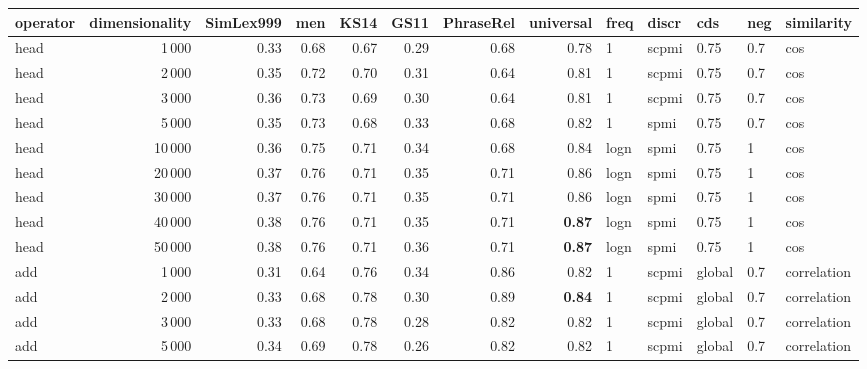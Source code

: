 \begin{tabular}{lrrrrrrrlllll}
\toprule
operator &  dimensionality &  SimLex999 &   men &  KS14 &  GS11 &  PhraseRel &  universal &  freq &  discr &     cds &  neg &     similarity \\
\midrule
    head &            1\,000 &       0.33 &  0.68 &  0.67 &  0.29 &       0.68 &       0.78 &     1 &  scpmi &    0.75 &  0.7 &            cos \\
    head &            2\,000 &       0.35 &  0.72 &  0.70 &  0.31 &       0.64 &       0.81 &     1 &  scpmi &    0.75 &  0.7 &            cos \\
    head &            3\,000 &       0.36 &  0.73 &  0.69 &  0.30 &       0.64 &       0.81 &     1 &  scpmi &    0.75 &  0.7 &            cos \\
    head &            5\,000 &       0.35 &  0.73 &  0.68 &  0.33 &       0.68 &       0.82 &     1 &   spmi &    0.75 &  0.7 &            cos \\
    head &           10\,000 &       0.36 &  0.75 &  0.71 &  0.34 &       0.68 &       0.84 &  logn &   spmi &    0.75 &    1 &            cos \\
    head &           20\,000 &       0.37 &  0.76 &  0.71 &  0.35 &       0.71 &       0.86 &  logn &   spmi &    0.75 &    1 &            cos \\
    head &           30\,000 &       0.37 &  0.76 &  0.71 &  0.35 &       0.71 &       0.86 &  logn &   spmi &    0.75 &    1 &            cos \\
    head &           40\,000 &       0.38 &  0.76 &  0.71 &  0.35 &       0.71 &       \textbf{0.87} &  logn &   spmi &    0.75 &    1 &            cos \\
    head &           50\,000 &       0.38 &  0.76 &  0.71 &  0.36 &       0.71 &       \textbf{0.87} &  logn &   spmi &    0.75 &    1 &            cos \\ \addlinespace
     add &            1\,000 &       0.31 &  0.64 &  0.76 &  0.34 &       0.86 &       0.82 &     1 &  scpmi &  global &  0.7 &    correlation \\
     add &            2\,000 &       0.33 &  0.68 &  0.78 &  0.30 &       0.89 &       \textbf{0.84} &     1 &  scpmi &  global &  0.7 &    correlation \\
     add &            3\,000 &       0.33 &  0.68 &  0.78 &  0.28 &       0.82 &       0.82 &     1 &  scpmi &  global &  0.7 &    correlation \\
     add &            5\,000 &       0.34 &  0.69 &  0.78 &  0.26 &       0.82 &       0.82 &     1 &  scpmi &  global &  0.7 &    correlation \\

\end{tabular}
